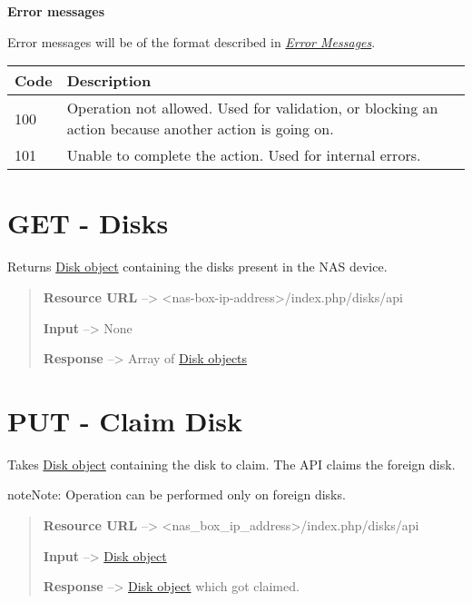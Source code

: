 \documentclass[letterpaper,10pt,english]{sphinxmanual}
\begin{document}
\textbf{Error messages}

Error messages will be of the format described in {\hyperref[responses:error-message]{\emph{Error Messages}}}.

\begin{tabulary}{\linewidth}{|L|L|}
\hline
\textbf{
Code
} & \textbf{
Description
}\\\hline

100
 & 
Operation not allowed. Used for validation,
or blocking an action because another action
is going on.
\\\hline

101
 & 
Unable to complete the action. Used for
internal errors.
\\\hline
\end{tabulary}



\section{GET - Disks}
\label{disks:get-disks}
Returns {\hyperref[disks:disk-object-label]{Disk object}} containing the disks present
in the NAS device.
\begin{quote}

\textbf{Resource URL} --\textgreater{} \textless{}nas-box-ip-address\textgreater{}/index.php/disks/api

\textbf{Input} --\textgreater{} None

\textbf{Response} --\textgreater{} Array of {\hyperref[disks:disk-object-label]{Disk objects}}
\end{quote}


\section{PUT - Claim Disk}
\label{disks:put-claim-disk}
Takes {\hyperref[disks:disk-object-label]{Disk object}} containing the disk to claim. The
API claims the foreign disk.

\begin{notice}{note}{Note:}
Operation can be performed only on foreign disks.
\end{notice}
\begin{quote}

\textbf{Resource URL} --\textgreater{} \textless{}nas\_box\_ip\_address\textgreater{}/index.php/disks/api

\textbf{Input} --\textgreater{} {\hyperref[disks:disk-object-label]{Disk object}}

\textbf{Response} --\textgreater{} {\hyperref[disks:disk-object-label]{Disk object}} which got claimed.
\end{quote}
\end{document}
